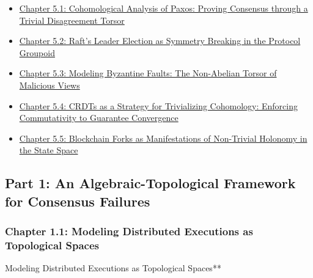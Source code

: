 \documentclass[
]{article}
\providecommand{\tightlist}{%
  \setlength{\itemsep}{0pt}\setlength{\parskip}{0pt}}
\begin{document}
\begin{itemize}
  \begin{itemize}
  \tightlist
  \item
    \hyperref[chapter-5-1-Cohomological_Analysis_of_Paxos__Proving]{Chapter
    5.1: Cohomological Analysis of Paxos: Proving Consensus through a
    Trivial Disagreement Torsor}
  \item
    \hyperref[chapter-5-2-Raft_s_Leader_Election_as_Symmetry_Break]{Chapter
    5.2: Raft's Leader Election as Symmetry Breaking in the Protocol
    Groupoid}
  \item
    \hyperref[chapter-5-3-Modeling_Byzantine_Faults__The_Non-Abeli]{Chapter
    5.3: Modeling Byzantine Faults: The Non-Abelian Torsor of Malicious
    Views}
  \item
    \hyperref[chapter-5-4-CRDTs_as_a_Strategy_for_Trivializing_Coh]{Chapter
    5.4: CRDTs as a Strategy for Trivializing Cohomology: Enforcing
    Commutativity to Guarantee Convergence}
  \item
    \hyperref[chapter-5-5-Blockchain_Forks_as_Manifestations_of_No]{Chapter
    5.5: Blockchain Forks as Manifestations of Non-Trivial Holonomy in
    the State Space}
  \end{itemize}
\end{itemize}

\subsection{Part 1: An Algebraic-Topological Framework for Consensus
Failures}\label{part-1-an-algebraic-topological-framework-for-consensus-failures}

\protect{}\label{part-1-An_Algebraic-Topological_Framework_for_C}{}

\subsubsection{Chapter 1.1: Modeling Distributed Executions as
Topological
Spaces}\label{chapter-1.1-modeling-distributed-executions-as-topological-spaces}

\protect{}\label{chapter-1-1-Modeling_Distributed_Executions_as_Topol}{}

Modeling Distributed Executions as Topological Spaces**
\end{document}
